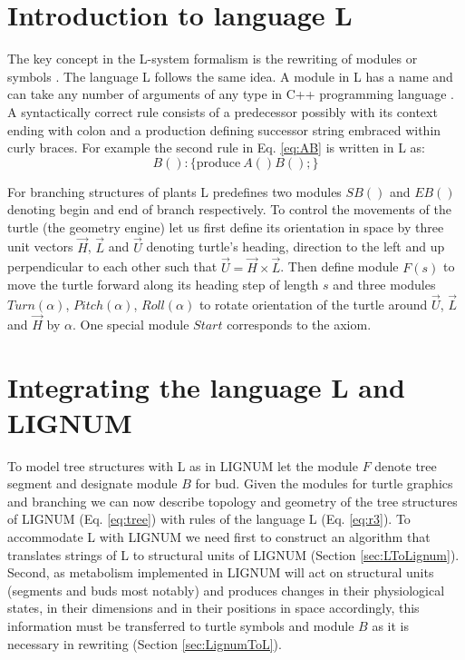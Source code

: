 \section{Introduction to language L}

The key concept in the  L-system formalism is the rewriting of modules
or symbols  \citep{pp:89}.  The  language L follows  the same  idea. A
module in  L has a name  and can take  any number of arguments  of any
type   in   C++   programming   language   \citep{stroustrup:97}.    A
syntactically correct rule consists of a predecessor possibly with its
context ending  with colon and a production  defining successor string
embraced  within curly  braces.  For  example the  second rule  in Eq.
\ref{eq:AB} is written in L as:
\begin{equation}\label{eq:r3}
 B(): \{\mathrm{produce}\ A()B();\}
\end{equation}

For branching structures of plants L predefines two modules $SB()$ and
$EB()$ denoting begin and end  of branch respectively.  To control the
movements of the turtle (the  geometry engine) let us first define its
orientation  in space by  three unit  vectors $\vec  H$, $\vec  L$ and
$\vec  U$ denoting  turtle's heading,  direction  to the  left and  up
perpendicular to each other such that $\vec U = \vec H \times \vec L$.
Then define module $F(s)$ to move the turtle forward along its heading
step of length $s$  and three modules $Turn(\alpha)$, $Pitch(\alpha)$,
$Roll(\alpha)$ to  rotate orientation of  the turtle around  $\vec U$,
$\vec  L$  and $\vec  H$  by  $\alpha$.   One special  module  $Start$
corresponds to the axiom.


\section{Integrating the language L and LIGNUM}\label{sec:pine}

To model tree structures with L as in LIGNUM let the module $F$ denote
tree segment and designate module  $B$ for bud.  Given the modules for
turtle  graphics  and  branching  we  can now  describe  topology  and
geometry of  the tree structures  of LIGNUM (Eq.   \ref{eq:tree}) with
rules of  the language  L (Eq.  \ref{eq:r3}).   To accommodate  L with
LIGNUM we need first to construct an algorithm that translates strings
of L to structural units of LIGNUM (Section \ref{sec:LToLignum}).  Second,
as  metabolism implemented  in  LIGNUM will  act  on structural  units
(segments  and  buds  most  notably)  and produces  changes  in  their
physiological states,  in their dimensions  and in their  positions in
space  accordingly, this  information  must be  transferred to  turtle
symbols  and module  $B$  as  it is  necessary  in rewriting  (Section
\ref{sec:LignumToL}).

